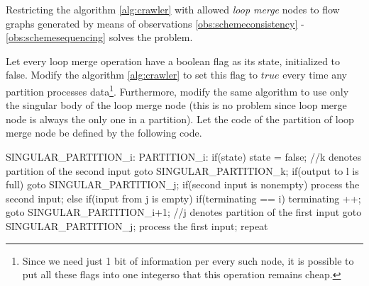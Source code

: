 
Restricting the algorithm \ref{alg:crawler} with allowed \emph{loop merge} nodes to flow graphs generated by means of observations \ref{obs:schemeconsistency} - \ref{obs:schemesequencing} solves the problem.

  Let every loop merge operation have a boolean flag as its state, initialized to false. Modify the algorithm \ref{alg:crawler} to set this flag to $true$ every time any partition processes data\footnote{Since we need just 1 bit of information per every such node, it is possible to put all these flags into one integer\footnotemark so that this operation remains cheap.}. Furthermore, modify the same algorithm to use only the singular body of the loop merge node (this is no problem since loop merge node is always the only one in a partition). Let the code of the partition of loop merge node be defined by the following code.
\myenddef
\begin{code}
SINGULAR_PARTITION_i:
PARTITION_i:
if(state)
{
  state = false;
  //k denotes partition of the second input
  goto SINGULAR_PARTITION_k; 
}
if(output to l is full)
  goto SINGULAR_PARTITION_j;
if(second input is nonempty)
{
  process the second input;
}
else
{
  if(input from j is empty)
  {
    if(terminating == i) 
    {
      terminating ++;
      goto SINGULAR_PARTITION_i+1;
    }
    //j denotes partition of the first input
    goto SINGULAR_PARTITION_j;
  }
  process the first input;
}
repeat
\end{code}

